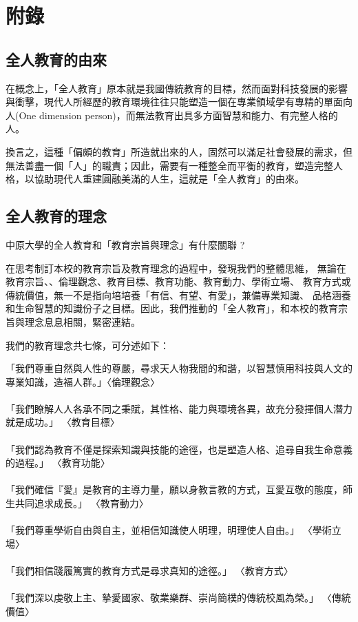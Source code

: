 
\section*{附錄}
\subsection*{全人教育的由來}
在概念上，「全人教育」原本就是我國傳統教育的目標，然而面對科技發展的影響與衝擊，現代人所經歷的教育環境往往只能塑造一個在專業領域學有專精的單面向人(One dimension person)，而無法教育出具多方面智慧和能力、有完整人格的人。
\par
換言之，這種「偏頗的教育」所造就出來的人，固然可以滿足社會發展的需求，但無法善盡一個「人」的職責；因此，需要有一種整全而平衡的教育，塑造完整人格，以協助現代人重建圓融美滿的人生，這就是「全人教育」的由來。

\subsection*{全人教育的理念}
中原大學的全人教育和「教育宗旨與理念」有什麼關聯 ? 
\par
在思考制訂本校的教育宗旨及教育理念的過程中，發現我們的整體思維， 無論在教育宗旨、、倫理觀念、教育目標、教育功能、教育動力、學術立場、 教育方式或傳統價值，無一不是指向培培養「有信、有望、有愛」，兼備專業知識、 品格涵養和生命智慧的知識份子之目標。因此，我們推動的「全人教育」，和本校的教育宗旨與理念息息相關，緊密連結。
\par
我們的教育理念共七條，可分述如下：
\\
\par
「我們尊重自然與人性的尊嚴，尋求天人物我間的和諧，以智慧慎用科技與人文的專業知識，造福人群。」〈倫理觀念〉 
\\\\
「我們瞭解人人各承不同之秉賦，其性格、能力與環境各異，故充分發揮個人潛力就是成功。」 〈教育目標〉 
\\\\
「我們認為教育不僅是探索知識與技能的途徑，也是塑造人格、追尋自我生命意義的過程。」 〈教育功能〉 
\\\\
「我們確信『愛』是教育的主導力量，願以身教言教的方式，互愛互敬的態度，師生共同追求成長。」 〈教育動力〉
\\\\
「我們尊重學術自由與自主，並相信知識使人明理，明理使人自由。」 〈學術立場〉
\\\\
「我們相信踐履篤實的教育方式是尋求真知的途徑。」 〈教育方式〉
\\\\
「我們深以虔敬上主、摯愛國家、敬業樂群、崇尚簡樸的傳統校風為榮。」 〈傳統價值〉
\\\\

